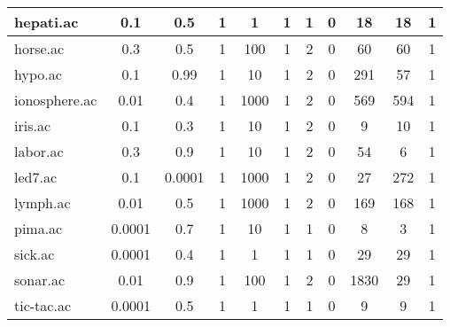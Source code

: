 \begin{table}[htbp]
\begin{tabular}{|l|c|c|c|c|c|c|c|c|c|c|}
		\hline
		hepati.ac      & 0.1      & 0.5         & 1              & 1                   & 1             & 1             & 0              & 18             & 18             & 1              \\
		\hline
		horse.ac       & 0.3      & 0.5         & 1              & 100                 & 1             & 2             & 0              & 60             & 60             & 1              \\
		\hline
		hypo.ac        & 0.1      & 0.99        & 1              & 10                  & 1             & 2             & 0              & 291            & 57             & 1              \\
		\hline
		ionosphere.ac  & 0.01     & 0.4         & 1              & 1000                & 1             & 2             & 0              & 569            & 594            & 1              \\
		\hline
		iris.ac        & 0.1      & 0.3         & 1              & 10                  & 1             & 2             & 0              & 9              & 10             & 1              \\
		\hline
		labor.ac       & 0.3      & 0.9         & 1              & 10                  & 1             & 2             & 0              & 54             & 6              & 1              \\
		\hline
		led7.ac        & 0.1      & 0.0001      & 1              & 1000                & 1             & 2             & 0              & 27             & 272            & 1              \\
		\hline
		lymph.ac       & 0.01     & 0.5         & 1              & 1000                & 1             & 2             & 0              & 169            & 168            & 1              \\
		\hline
		pima.ac        & 0.0001   & 0.7         & 1              & 10                  & 1             & 1             & 0              & 8              & 3              & 1              \\
		\hline
		sick.ac        & 0.0001   & 0.4         & 1              & 1                   & 1             & 1             & 0              & 29             & 29             & 1              \\
		\hline
		sonar.ac       & 0.01     & 0.9         & 1              & 100                 & 1             & 2             & 0              & 1830           & 29             & 1              \\
		\hline
		tic-tac.ac     & 0.0001   & 0.5         & 1              & 1                   & 1             & 1             & 0              & 9              & 9              & 1              \\

\end{tabular}
\end{table}

